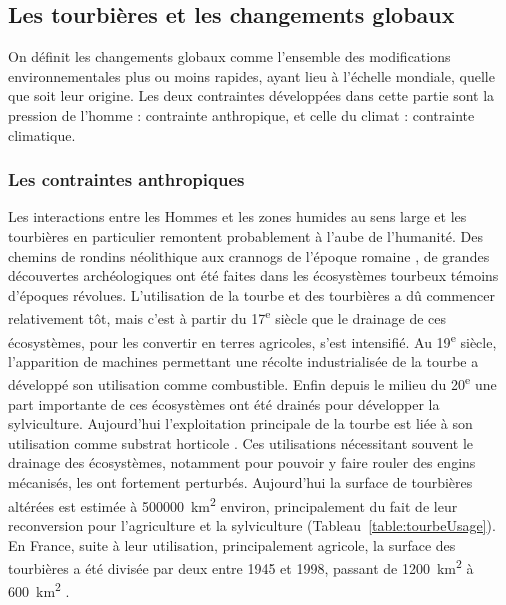 \subsection{Les tourbières et les changements globaux}
On définit les changements globaux comme l'ensemble des modifications environnementales plus ou moins rapides, ayant lieu à l'échelle mondiale, quelle que soit leur origine. Les deux contraintes développées dans cette partie sont la pression de l'homme : contrainte anthropique, et celle du climat : contrainte climatique.

\subsubsection{Les contraintes anthropiques}

Les interactions entre les Hommes et les zones humides au sens large et les tourbières en particulier remontent probablement à l'aube de l'humanité.
Des chemins de rondins néolithique aux crannogs de l'époque romaine \citep{buckland1993}, de grandes découvertes archéologiques ont été faites dans les écosystèmes tourbeux témoins d'époques révolues.
L’utilisation de la tourbe et des tourbières a dû commencer relativement tôt, mais c'est à partir du 17\textsuperscript{e} siècle que le drainage de ces écosystèmes, pour les convertir en terres agricoles, s'est intensifié.
Au 19\textsuperscript{e} siècle, l'apparition de machines permettant une récolte industrialisée de la tourbe a développé son utilisation comme combustible.
Enfin depuis le milieu du 20\textsuperscript{e} une part importante de ces écosystèmes ont été drainés pour développer la sylviculture.
Aujourd'hui l'exploitation principale de la tourbe est liée à son utilisation comme substrat horticole \citep{lappalainen1996,chapman2003}.
Ces utilisations nécessitant souvent le drainage des écosystèmes, notamment pour pouvoir y faire rouler des engins mécanisés, les ont fortement perturbés.
Aujourd'hui la surface de tourbières altérées est estimée à \SI{500000}{\square\kilo\metre} environ, principalement du fait de leur reconversion pour l'agriculture et la sylviculture (Tableau~\ref{table:tourbeUsage}).
En France, suite à leur utilisation, principalement agricole, la surface des tourbières a été divisée par deux entre 1945 et 1998, passant de \SI{1200}{\square\kilo\meter} à \SI{600}{\square\kilo\meter} \citep{lappalainen1996,manneville1999}.

